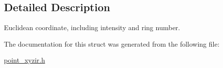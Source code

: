 \subsection{Detailed Description}
Euclidean coordinate, including intensity and ring number. 

The documentation for this struct was generated from the following file\-:\begin{DoxyCompactItemize}
\item 
\hyperlink{point__xyzir_8h}{point\-\_\-xyzir.\-h}\end{DoxyCompactItemize}
